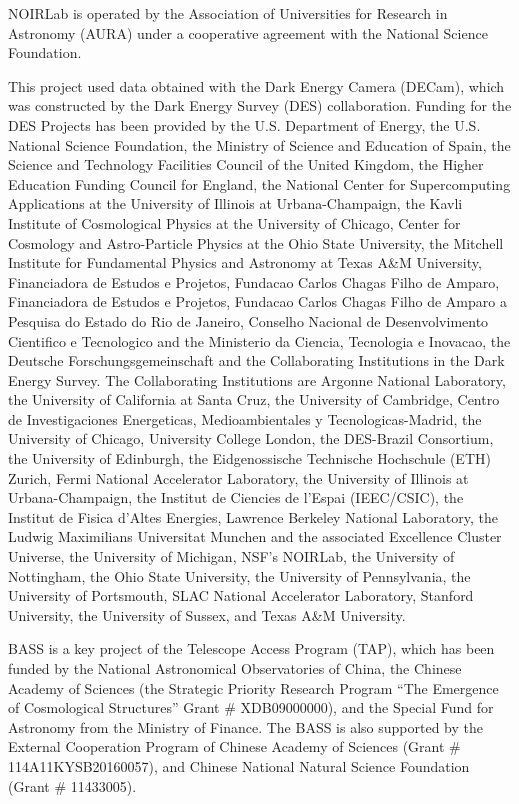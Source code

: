 \documentclass[fleqn,usenatbib]{mnras}
\begin{document}
NOIRLab is operated by the Association of Universities for Research in
Astronomy (AURA) under a cooperative agreement with the National Science
Foundation.

This project used data obtained with the Dark Energy Camera (DECam), which was
constructed by the Dark Energy Survey (DES) collaboration. Funding for the DES
Projects has been provided by the U.S. Department of Energy, the U.S. National
Science Foundation, the Ministry of Science and Education of Spain, the Science
and Technology Facilities Council of the United Kingdom, the Higher Education
Funding Council for England, the National Center for Supercomputing
Applications at the University of Illinois at Urbana-Champaign, the Kavli
Institute of Cosmological Physics at the University of Chicago, Center for
Cosmology and Astro-Particle Physics at the Ohio State University, the Mitchell
Institute for Fundamental Physics and Astronomy at Texas A\&M University,
Financiadora de Estudos e Projetos, Fundacao Carlos Chagas Filho de Amparo,
Financiadora de Estudos e Projetos, Fundacao Carlos Chagas Filho de Amparo a
Pesquisa do Estado do Rio de Janeiro, Conselho Nacional de Desenvolvimento
Cientifico e Tecnologico and the Ministerio da Ciencia, Tecnologia e Inovacao,
the Deutsche Forschungsgemeinschaft and the Collaborating Institutions in the
Dark Energy Survey. The Collaborating Institutions are Argonne National
Laboratory, the University of California at Santa Cruz, the University of
Cambridge, Centro de Investigaciones Energeticas, Medioambientales y
Tecnologicas-Madrid, the University of Chicago, University College London, the
DES-Brazil Consortium, the University of Edinburgh, the Eidgenossische
Technische Hochschule (ETH) Zurich, Fermi National Accelerator Laboratory, the
University of Illinois at Urbana-Champaign, the Institut de Ciencies de l’Espai
(IEEC/CSIC), the Institut de Fisica d’Altes Energies, Lawrence Berkeley
National Laboratory, the Ludwig Maximilians Universitat Munchen and the
associated Excellence Cluster Universe, the University of Michigan, NSF’s
NOIRLab, the University of Nottingham, the Ohio State University, the
University of Pennsylvania, the University of Portsmouth, SLAC National
Accelerator Laboratory, Stanford University, the University of Sussex, and
Texas A\&M University.

BASS is a key project of the Telescope Access Program (TAP), which has been
funded by the National Astronomical Observatories of China, the Chinese Academy
of Sciences (the Strategic Priority Research Program “The Emergence of
Cosmological Structures” Grant \# XDB09000000), and the Special Fund for
Astronomy from the Ministry of Finance. The BASS is also supported by the
External Cooperation Program of Chinese Academy of Sciences (Grant \#
114A11KYSB20160057), and Chinese National Natural Science Foundation (Grant \#
11433005).
\end{document}
